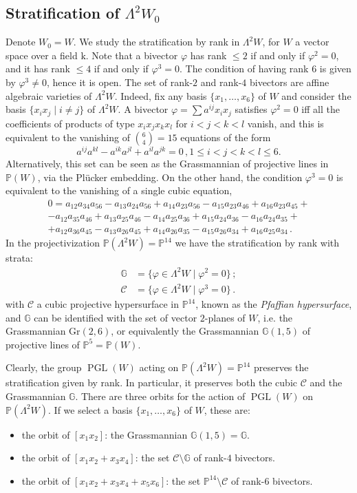 \documentclass[10pt,reqno]{amsart}
\newcommand{\cC}{{\mathcal{C}}}
\newcommand{\GG}{\mathbb{G}}
\newcommand{\PP}{\mathbb P}
\newcommand{\PGL}{\operatorname{PGL}}
\newcommand{\f}{\varphi}
\renewcommand{\L}{\Lambda}
\newcommand{\kk}{\mathrm{k}}
\theoremstyle{definition}
\begin{document}
\subsection{Stratification of $\L^2 W_0$}

Denote $W_0=W$. We study the stratification by rank in $\L^2 W$, for $W$ a vector space over a field $\kk$.
Note that a bivector $\f$ has rank $\le 2$ if and only if $\f^2=0$, and it has rank $\le 4$ if and only if $\f^3=0$. The condition of having rank $6$ is given by $\f^3 \ne 0$, hence it is open. 
The set of rank-$2$ and rank-$4$ bivectors are affine algebraic varieties of $\L^2 W$. Indeed, fix any basis $\{x_1,\dots,x_6\}$ of $W$ and consider the basis $\{x_ix_j \mid i \ne j \}$ of $\L^2 W$. 
A bivector $\f=\sum a^{ij}x_ix_j$ satisfies $\f^2=0$ iff all the coefficients of products of type $x_ix_jx_kx_l$ for $i<j<k<l$ vanish, and this is equivalent to the vanishing of $\binom{6}{4}=15$ equations of the form 
\[
a^{ij}a^{kl}-a^{ik}a^{jl}+a^{il}a^{jk}=0 \, , 1\le i<j<k<l \le 6 .
\]
Alternatively, this set can be seen as the Grassmannian of projective lines in $\PP(W)$, via the Plücker embedding.
On the other hand, the condition $\f^3=0$ is equivalent to the vanishing of a single cubic equation,
\begin{align}\label{eq:cubic}
    0=a_{12}a_{34}a_{56} - a_{13}a_{24}a_{56} + a_{14}a_{23}a_{56} - a_{15}a_{23}a_{46} + a_{16}a_{23}a_{45} + \nonumber \\
-a_{12}a_{35}a_{46} + a_{13}a_{25}a_{46} - a_{14}a_{25}a_{36} + a_{15}a_{24}a_{36} - a_{16}a_{24}a_{35} + \nonumber\\
+a_{12}a_{36}a_{45} - a_{13}a_{26}a_{45} + a_{14}a_{26}a_{35} - a_{15}a_{26}a_{34} + a_{16}a_{25}a_{34}\, .
\end{align} 
In the projectivization $\PP(\L^2W)=\PP^{14}$ we have the stratification by rank with strata:
\begin{align*}
    \GG& = \{ \f \in \L^2 W \mid \f^2=0 \} \, ; \\
    \cC & =\{ \f \in \L^2 W \mid \f^3=0 \}\, .
\end{align*}
with $\cC$ a cubic projective hypersurface in $\PP^{14}$, known as the {\em Pfaffian hypersurface}, and $\GG$ can be identified with the set of vector $2$-planes of $W$, i.e. the Grassmannian $\mathrm{Gr}(2,6)$, or equivalently the Grassmannian $\GG(1,5)$ of projective lines of $\PP^5=\PP(W)$.

\noindent Clearly, the group $\PGL(W)$ acting on $\PP(\L^2W)=\PP^{14}$ preserves the stratification given by rank. In particular, it preserves both the cubic $\cC$ and the Grassmannian $\GG$. There are three orbits for the action of $\PGL(W)$ on $\PP(\L^2 W)$. If we select a basis $\{x_1,\dots,x_6\}$ of $W$, these are: 
\begin{itemize}
\item the orbit of $[x_1x_2]$: the Grassmannian $\GG(1,5)=\GG$. 
\item the orbit of $[x_1x_2+x_3x_4]$: the set $\cC \setminus \GG$ of rank-$4$ bivectors.
\item the orbit of $[x_1x_2+x_3x_4+x_5x_6]$: the set $\PP^{14} \setminus \cC$ of rank-$6$ bivectors.
\end{itemize}
\end{document}
